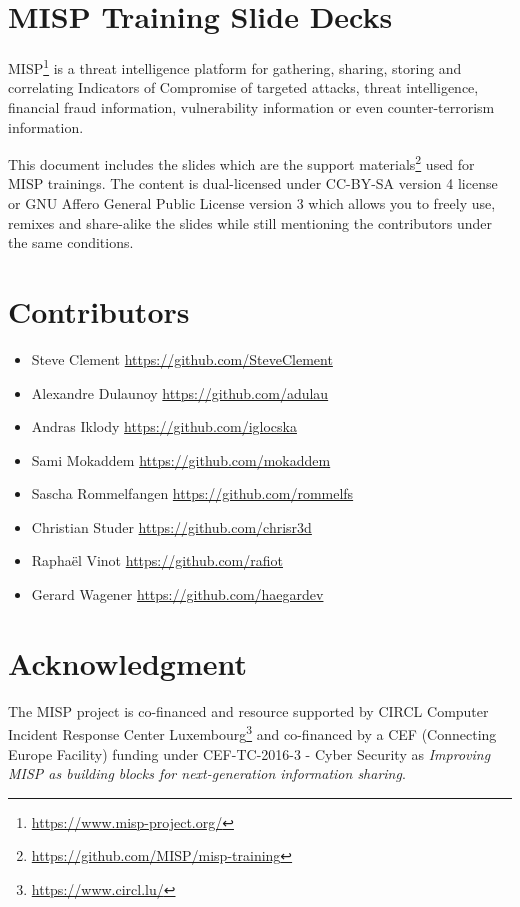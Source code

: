\documentclass{article}
\begin{document}
\section*{MISP Training Slide Decks}

MISP\footnote{\url{https://www.misp-project.org/}} is a threat intelligence platform for gathering, sharing, storing and correlating Indicators of Compromise of targeted attacks, threat intelligence, financial fraud information, vulnerability information or even counter-terrorism information.

This document includes the slides which are the support materials\footnote{\url{https://github.com/MISP/misp-training}} used for MISP trainings. The content is dual-licensed under CC-BY-SA version 4 license or GNU Affero General Public License version 3 which allows you to freely use, remixes and share-alike the slides while still mentioning the contributors under the same conditions.

\section*{Contributors}

\begin{itemize}
\item Steve Clement \url{https://github.com/SteveClement}
\item Alexandre Dulaunoy \url{https://github.com/adulau}
\item Andras Iklody \url{https://github.com/iglocska}
\item Sami Mokaddem \url{https://github.com/mokaddem}
\item Sascha Rommelfangen \url{https://github.com/rommelfs}
\item Christian Studer  \url{https://github.com/chrisr3d}
\item Raphaël Vinot \url{https://github.com/rafiot}
\item Gerard Wagener \url{https://github.com/haegardev}
\end{itemize}

\section*{Acknowledgment}

The MISP project is co-financed and resource supported by CIRCL Computer Incident Response Center Luxembourg\footnote{\url{https://www.circl.lu/}} and co-financed by a CEF (Connecting Europe Facility) funding under CEF-TC-2016-3 - Cyber Security as {\it Improving MISP as building blocks for next-generation information sharing}.
\end{document}

